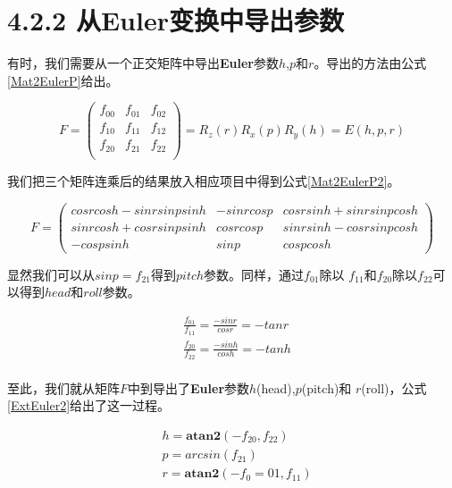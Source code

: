 \documentclass{ctexart}
\begin{document}
\section{4.2.2 从Euler变换中导出参数}

有时，我们需要从一个正交矩阵中导出\textbf{Euler}参数$h$,$p$和$r$。导出的方法由公式\ref{Mat2EulerP}给出。

\begin{equation}
	\label{Mat2EulerP}
	F=\left(
	\begin{array}{ccc}
		f_{00} & f_{01} & f_{02}\\
		f_{10} & f_{11} & f_{12}\\
		f_{20} & f_{21} & f_{22}\\
	\end{array}
	\right)=R_{z}(r)R_{x}(p)R_{y}(h)=E(h,p,r)
\end{equation}

我们把三个矩阵连乘后的结果放入相应项目中得到公式\ref{Mat2EulerP2}。

\begin{equation}
	\label{Mat2EulerP2}
	F=\left(
	\begin{array}{ccc}
		cosrcosh-sinrsinpsinh & -sinrcosp & cosrsinh+sinrsinpcosh\\
		sinrcosh+cosrsinpsinh & cosrcosp  & sinrsinh-cosrsinpcosh\\
		-cospsinh			  & sinp	  & cospcosh
	\end{array}
	\right)
\end{equation}

显然我们可以从$sinp=f_{21}$得到$pitch$参数。同样，通过$f_{01}$除以
$f_{11}$和$f_{20}$除以$f_{22}$可以得到$head$和$roll$参数。

\begin{equation}
	\label{ExtEuler1}
	\begin{split}
		&\frac{f_{01}}{f_{11}}=\frac{-sinr}{cosr}=-tanr\\
		&\frac{f_{20}}{f_{22}}=\frac{-sinh}{cosh}=-tanh\\
	\end{split}
\end{equation}

至此，我们就从矩阵$F$中到导出了\textbf{Euler}参数$h$(head),$p$(pitch)和
$r$(roll)，公式\ref{ExtEuler2}给出了这一过程。

\begin{equation}
	\label{ExtEuler2}
	\begin{split}
		&h=\textbf{atan2}(-f_{20},f_{22})\\
		&p=arcsin(f_{21})\\
		&r=\textbf{atan2}(-f_0={01},f_{11})\\
	\end{split}
\end{equation}
\end{document}
